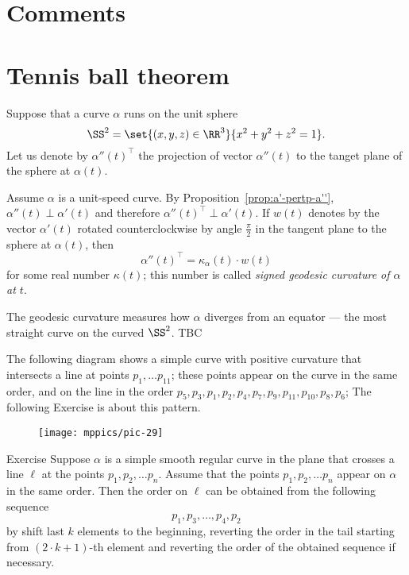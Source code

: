 \section{Comments}


\section{Tennis ball theorem}

Suppose that a curve $\alpha$ runs on the unit sphere 
\[\SS^2=\set{(x,y,z)\in\RR^3}{x^2+y^2+z^2=1}.\] 
Let us denote by $\alpha''(t)^\top$ the projection of vector $\alpha''(t)$ to the tanget plane of the sphere at $\alpha(t)$.

Assume $\alpha$ is a unit-speed curve.
By Proposition~\ref{prop:a'-pertp-a''}, $\alpha''(t)\perp\alpha'(t)$ and therefore $\alpha''(t)^\top\perp\alpha'(t)$.
If $w(t)$ denotes by the vector $\alpha'(t)$ rotated
counterclockwise by angle $\tfrac\pi2$ in the tangent plane to the sphere at $\alpha(t)$, then 
\[\alpha''(t)^\top=\kappa_\alpha(t)\cdot w(t)\]
for some real number $\kappa(t)$;
this number is called \emph{signed geodesic curvature of $\alpha$ at $t$}.

The geodesic curvature measures how $\alpha$ diverges from an equator --- the most straight curve on the curved $\SS^2$.
TBC














The following diagram shows a simple curve with positive curvature that intersects a line at points $p_1,\dots p_11$; these points appear on the curve in the same order, and on the line  in the order $p_5,p_3,p_1,p_2,p_4,p_7,p_9,p_{11},p_{10},p_8,p_6$; 
The following Exercise is about this pattern.

\begin{figure}[h!]
\vskip-0mm
\centering
\texttt{[image: mppics/pic-29]}
\vskip0mm
\end{figure}

\begin{thm}{Exercise}
Suppose $\alpha$ is a simple smooth regular curve in the plane that crosses a line $\ell$ at the points $p_1,p_2,\dots p_n$.
Assume that the points $p_1,p_2,\dots p_n$ appear on $\alpha$ in the same order.
Then the order on $\ell$ can be obtained from the following sequence 
\[p_1,p_3,\dots,p_4 ,p_2\]
by shift last $k$ elements to the beginning, reverting the order in the tail starting from $(2\cdot k+1)$-th element and reverting the order of the obtained sequence if necessary.
\end{thm}





